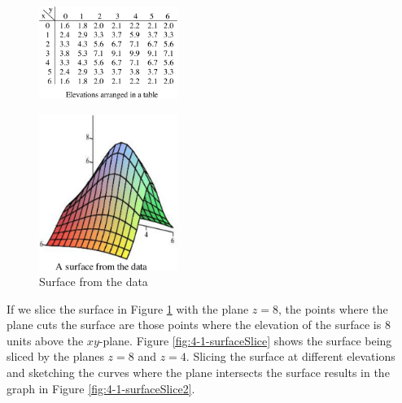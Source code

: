\begin{figure}[!ht]
  \centering
    \includegraphics[width=0.4\textwidth]{img/chap4/image018.png}
  \end{figure}
  \begin{figure}[!ht]
    \centering
      \includegraphics[width=0.4\textwidth]{img/chap4/image019.png}
      \caption{Surface from the data}
      \label{fig:4-1-surface2}
    \end{figure}
If we slice the surface in Figure \ref{fig:4-1-surface2} with the plane $z=8$, the points where the plane cuts the surface are those points where the elevation of the surface is 8 units above the $xy$-plane. Figure \ref{fig:4-1-surfaceSlice} shows the surface being sliced by the planes $z=8$ and $z=4$. Slicing the surface at different elevations and sketching the curves where the plane intersects the surface results in the graph in Figure \ref{fig:4-1-surfaceSlice2}.

